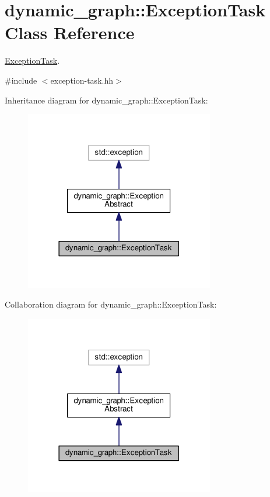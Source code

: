 \hypertarget{classdynamic__graph_1_1ExceptionTask}{}\section{dynamic\+\_\+graph\+:\+:Exception\+Task Class Reference}
\label{classdynamic__graph_1_1ExceptionTask}


\hyperlink{classdynamic__graph_1_1ExceptionTask}{Exception\+Task}.  




{\ttfamily \#include $<$exception-\/task.\+hh$>$}



Inheritance diagram for dynamic\+\_\+graph\+:\+:Exception\+Task\+:\nopagebreak
\begin{figure}[H]
\begin{center}
\leavevmode
\includegraphics[width=234pt]{classdynamic__graph_1_1ExceptionTask__inherit__graph}
\end{center}
\end{figure}


Collaboration diagram for dynamic\+\_\+graph\+:\+:Exception\+Task\+:\nopagebreak
\begin{figure}[H]
\begin{center}
\leavevmode
\includegraphics[width=234pt]{classdynamic__graph_1_1ExceptionTask__coll__graph}
\end{center}
\end{figure}
